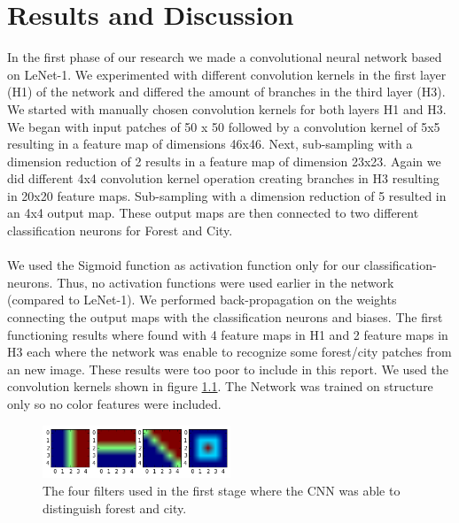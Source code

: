 \documentclass[a4paper,onecolumn]{report}
\begin{document}
\chapter{Results and Discussion}
\label{sec:resultsanddiscussion}
In the first phase of our research we made a convolutional neural network based on LeNet-1. We experimented with different convolution kernels in the first layer (H1) of the network and differed the amount of branches in the third layer (H3). We started with manually chosen convolution kernels for both layers H1 and H3. We began with input patches of 50 x 50 followed by a convolution kernel of 5x5 resulting in a feature map of dimensions 46x46. Next, sub-sampling with a dimension reduction of 2 results in a feature map of dimension 23x23. Again we did different 4x4 convolution kernel operation creating branches in H3 resulting in 20x20 feature maps. Sub-sampling with a dimension reduction of 5 resulted in an 4x4 output map. These output maps are then connected to two different classification neurons for Forest and City. \\\\
We used the Sigmoid function as activation function only for our classification-neurons. Thus, no activation functions were used earlier in the network (compared to LeNet-1). We performed back-propagation on the weights connecting the output maps with the classification neurons and biases. The first functioning results where found with 4 feature maps in H1 and 2 feature maps in H3 each where the network was enable to recognize some forest/city patches from an new image. These results were too poor to include in this report. We used the convolution kernels shown in figure \ref{fig:firstFilters}. The Network was trained on structure only so no color features were included. 
\begin{figure}[bth!]
	\centering
	\includegraphics[width=0.5\textwidth]{./images/firstFilters.png}
	\caption{The four filters used in the first stage where the CNN was able to distinguish forest and city.}
	\label{fig:firstFilters}
\end{figure} 
\\\\
\end{document}
